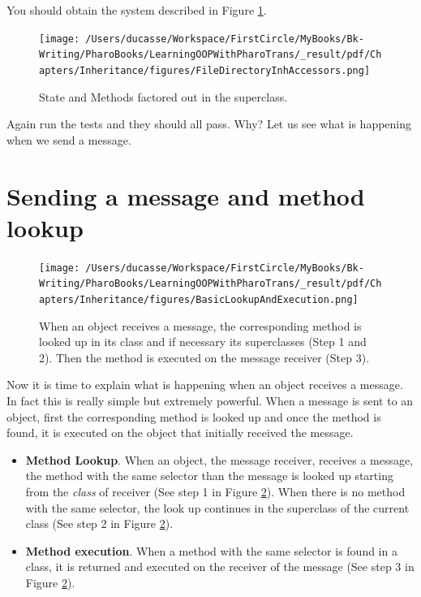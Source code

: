 \documentclass[10pt,twoside,english]{_support/latex/sbabook/sbabook}
\begin{document}
You should obtain the system described in Figure \ref{FileDirectoryInhAccessors}.


\begin{figure}

\begin{center}
\texttt{[image: /Users/ducasse/Workspace/FirstCircle/MyBooks/Bk-Writing/PharoBooks/LearningOOPWithPharoTrans/\_result/pdf/Chapters/Inheritance/figures/FileDirectoryInhAccessors.png]}\caption{ State and Methods factored out in the superclass.\label{FileDirectoryInhAccessors}}\end{center}
\end{figure}


Again run the tests and they should all pass. Why? Let us see what is happening when we send a message.
\section{Sending a message and method lookup }

\begin{figure}

\begin{center}
\texttt{[image: /Users/ducasse/Workspace/FirstCircle/MyBooks/Bk-Writing/PharoBooks/LearningOOPWithPharoTrans/\_result/pdf/Chapters/Inheritance/figures/BasicLookupAndExecution.png]}\caption{When an object receives a message, the corresponding method is looked up in its class and if necessary its superclasses (Step 1 and 2). Then the method is executed on the message receiver (Step 3).\label{BasicLookup}}\end{center}
\end{figure}


Now it is time to explain what is happening when an object receives a message. In fact this is really simple but extremely powerful. When a message is sent to an object, first the corresponding method is looked up and once the method is found, it is executed on the object that initially received the message. 

\begin{itemize}
\item \textbf{Method Lookup}. When an object, the message receiver, receives a message, the method with the same selector than the message is looked up starting from the \textit{class} of receiver (See step 1 in Figure \ref{BasicLookup}). When there is no method with the same selector, the look up continues in the superclass of the current class (See step 2 in Figure \ref{BasicLookup}).
\item \textbf{Method execution}. When a method with the same selector is found in a class, it is returned and executed on the receiver of the message (See step 3 in Figure \ref{BasicLookup}). 
\end{itemize}
\end{document}
